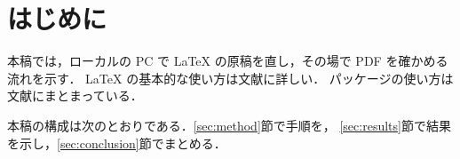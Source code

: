 \section{はじめに}\label{sec:intro}

本稿では，ローカルの PC で LaTeX の原稿を直し，その場で PDF を確かめる流れを示す．
LaTeX の基本的な使い方は文献\cite{lamport1994latex,knuth1984texbook}に詳しい．
パッケージの使い方は文献\cite{mittelbach2004companion}にまとまっている．

本稿の構成は次のとおりである．\ref{sec:method}節で手順を，
\ref{sec:results}節で結果を示し，\ref{sec:conclusion}節でまとめる．
